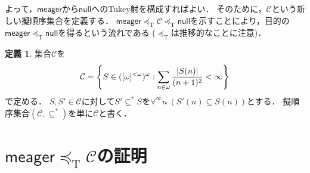 \documentclass[uplatex,dvipdfmx]{jsarticle}
\newcommand{\scrC}{\mathcal{C}}
\newcommand{\tukeyle}{\preceq_\mathrm{T}}
\newcommand{\nul}{\mathsf{null}}
\newcommand{\meager}{\mathsf{meager}}
\DeclarePairedDelimiter\abs{\lvert}{\rvert}
\renewcommand\subset{\subseteq}
\theoremstyle{definition}
\newtheorem{defi}[thm]{定義}
\theoremstyle{named}
\begin{document}
	よって，$\meager$から$\nul$へのTukey射を構成すればよい．
	そのために，$\scrC$という新しい擬順序集合を定義する．
	$\meager \tukeyle \scrC \tukeyle \nul$を示すことにより，目的の$\meager \tukeyle \nul$を得るという流れである ($\tukeyle$は推移的なことに注意)．
	
	\begin{defi}
		集合$\scrC$を
		\[\scrC = \left\{ S \in ([\omega]^{<\omega})^\omega : \sum_{n \in \omega} \frac{\abs{S(n)}}{(n+1)^2} < \infty \right\}\]
		で定める．
		$S, S' \in \scrC$に対して$S' \subset^* S$を$\forall^\infty n\ (S'(n) \subset S(n))$とする．
		擬順序集合$(\scrC, \subset^*)$を単に$\scrC$と書く．
	\end{defi}
	
	\section{$\meager \tukeyle \scrC$の証明}
	
\end{document}

